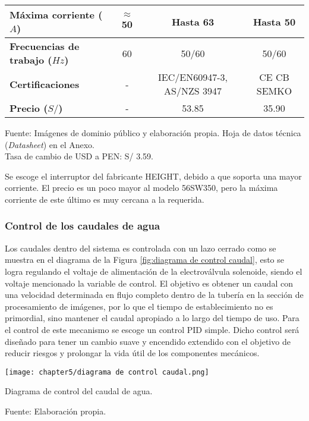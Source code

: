 \begin{mytable}[H]
\begin{tabular}{l|c|c|c|}
		\multicolumn{1}{|l|}{\textbf{Máxima corriente ($A$)}} & $\approx$ 50 & Hasta 63 & Hasta 50 \\ \hline
		\multicolumn{1}{|l|}{\textbf{Frecuencias de trabajo ($Hz$)}} & 60 & 50/60 & 50/60  \\ \hline
		\multicolumn{1}{|l|}{\textbf{Certificaciones}} & - & IEC/EN60947-3, AS/NZS 3947 & CE CB SEMKO \\ \hline
		\multicolumn{1}{|l|}{\textbf{Precio ($S/$)}} & - & 53.85 & 35.90 \\ \hline
	\end{tabular}
	\begin{myflushcenteraftertable}	
		Fuente: Imágenes de dominio público y elaboración propia. Hoja de datos técnica (\textit{Datasheet}) en el Anexo.\\
		Tasa de cambio de USD a PEN: S/ 3.59.
	\end{myflushcenteraftertable}
\end{mytable}

Se escoge el interruptor del fabricante HEIGHT, debido a que soporta una mayor corriente. El precio es un poco mayor al modelo 56SW350, pero la máxima corriente de este último es muy cercana a la requerida.

\subsubsection{Control de los caudales de agua}

Los caudales dentro del sistema es controlada con un lazo cerrado como se muestra en el diagrama de la Figura \ref{fig:diagrama de control caudal}, esto se logra regulando el voltaje de alimentación de la electroválvula solenoide, siendo el voltaje mencionado la variable de control. El objetivo es obtener un caudal con una velocidad determinada en flujo completo dentro de la tubería en la sección de procesamiento de imágenes, por lo que el tiempo de establecimiento no es primordial, sino mantener el caudal apropiado a lo largo del tiempo de uso. Para el control de este mecanismo se escoge un control PID simple. Dicho control será diseñado para tener un cambio suave y encendido extendido con el objetivo de reducir riesgos y prolongar la vida útil de los componentes mecánicos.

\begin{myfigure}[H]
	\footnotesize\centering
	\texttt{[image: chapter5/diagrama de control caudal.png]}
	\caption{Diagrama de control del caudal de agua.}
	\begin{myflushcenter}
		Fuente: Elaboración propia.
	\end{myflushcenter}
	\label{fig:diagrama de control caudal}
\end{myfigure}

